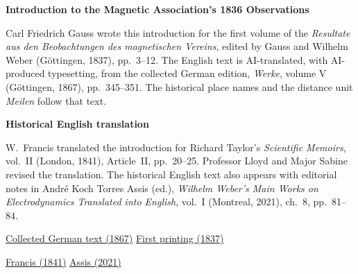 \clearpage
\thispagestyle{empty}
\begin{center}
\Large\textbf{Introduction to the Magnetic Association's 1836 Observations}
\end{center}

Carl Friedrich Gauss wrote this introduction for the first volume of the \textit{Resultate aus den Beobachtungen des magnetischen Vereins}, edited by Gauss and Wilhelm Weber (Göttingen, 1837), pp.~3--12. The English text is AI-translated, with AI-produced typesetting, from the collected German edition, \textit{Werke}, volume V (Göttingen, 1867), pp.~345--351. The historical place names and the distance unit \textit{Meilen} follow that text.

\medskip\noindent\textbf{Historical English translation}\par\smallskip
\noindent W.~Francis translated the introduction for Richard Taylor's \textit{Scientific Memoirs}, vol.~II (London, 1841), Article~II, pp.~20--25. Professor Lloyd and Major Sabine revised the translation. The historical English text also appears with editorial notes in André Koch Torres Assis (ed.), \textit{Wilhelm Weber's Main Works on Electrodynamics Translated into English}, vol.~I (Montreal, 2021), ch.~8, pp.~81--84.

\medskip\noindent
\href{https://gdz.sub.uni-goettingen.de/id/PPN236006339}{Collected German text (1867)}\quad
\href{https://archive.org/details/ResultateausdenBd1Gaus/page/n9/mode/2up}{First printing (1837)}\par\smallskip\noindent
\href{https://archive.org/details/s1id11857360/page/n82/mode/2up}{Francis (1841)}\quad
\href{https://www.ifi.unicamp.br/~assis/Weber-in-English-Vol-1.pdf\#page=84}{Assis (2021)}
\clearpage
